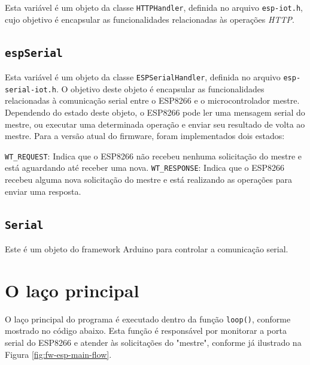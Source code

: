 Esta variável é um objeto da classe \texttt{HTTPHandler}, definida no arquivo \texttt{esp-iot.h}, cujo objetivo é encapsular as funcionalidades relacionadas às operações \textit{HTTP}.

\subsection{\texttt{espSerial}}

Esta variável é um objeto da classe \texttt{ESPSerialHandler}, definida no arquivo \texttt{esp-serial-iot.h}. O objetivo deste objeto é encapsular as funcionalidades relacionadas à comunicação serial entre o ESP8266 e o microcontrolador mestre. Dependendo do estado deste objeto, o ESP8266 pode ler uma mensagem serial do mestre, ou executar uma determinada operação e enviar seu resultado de volta ao mestre. Para a versão atual do firmware, foram implementados dois estados:

\texttt{WT\_REQUEST}: Indica que o ESP8266 não recebeu nenhuma solicitação do mestre e está aguardando até receber uma nova.
\texttt{WT\_RESPONSE}: Indica que o ESP8266 recebeu alguma nova solicitação do mestre e está realizando as operações para enviar uma resposta.

\subsection{\texttt{Serial}}

Este é um objeto do framework Arduino para controlar a comunicação serial.

\section{O laço principal}

O laço principal do programa é executado dentro da função \texttt{loop()}, conforme mostrado no código abaixo. Esta função é responsável por monitorar a porta serial do ESP8266 e atender às solicitações do "mestre", conforme já ilustrado na Figura \ref{fig:fw-esp-main-flow}.

